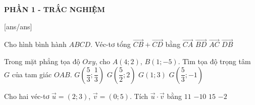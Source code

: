 
\begin{center}
	\textbf{PHẦN 1 - TRẮC NGHIỆM}
\end{center}
[ans/ans]
\begin{ex}%
	Cho hình bình hành $ABCD$. Véc-tơ tổng $\vec{CB}+\vec{CD}$ bằng
	\choice
	{\True $\vec{CA}$}
	{$\vec{BD}$}
	{$\vec{AC}$}
	{$\vec{DB}$}
\end{ex}
\begin{ex}%
	Trong mặt phẳng tọa độ $Oxy$, cho $A(4;2)$, $B(1;-5)$. Tìm tọa độ trọng tâm $G$ của tam giác $OAB$.
	\choice
	{$G\left(\dfrac{5}{3};\dfrac{1}{3}\right)$}
	{$G\left(\dfrac{5}{2};2\right)$}
	{$G\left(1;3\right)$}
	{\True $G\left(\dfrac{5}{3};-1\right)$}
\end{ex}
\begin{ex}%
	Cho hai véc-tơ $\vec{u}=(2;3)$, $\vec{v}=(0;5)$. Tích $\vec{u}\cdot\vec{v}$ bằng
	\choice
	{$11$}
	{$-10$}
	{\True $15$}
	{$-2$}
\end{ex}

